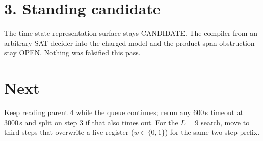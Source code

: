 \documentclass[11pt]{article}
\begin{document}
\section*{3. Standing candidate}
The time-state-representation surface stays CANDIDATE. The compiler from an arbitrary SAT decider into the charged model and the product-span obstruction stay OPEN. Nothing was falsified this pass.

\section*{Next}
Keep reading parent 4 while the queue continues; rerun any 600\,s timeout at 3000\,s and split on step 3 if that also times out. For the $L=9$ search, move to third steps that overwrite a live register ($w\in\{0,1\}$) for the same two-step prefix.
\end{document}
